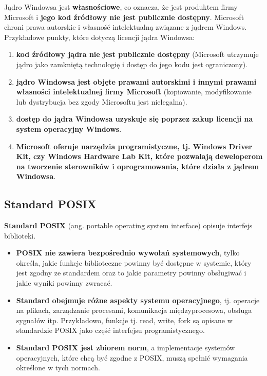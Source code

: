 \documentclass{article}
\begin{document}
Jądro Windowsa jest \textbf{własnościowe}, co oznacza, że jest produktem firmy Microsoft i \textbf{jego kod źródłowy nie jest publicznie dostępny}. Microsoft chroni prawa autorskie i własność intelektualną związane z jądrem Windows.
Przykładowe punkty, które dotyczą licencji jądra Windowsa: 
\begin{enumerate}
    \item \textbf{kod źródłowy jądra nie jest publicznie dostępny} (Microsoft utrzymuje jądro jako zamkniętą technologię i dostęp do jego kodu jest ograniczony).
    \item \textbf{jądro Windowsa jest objęte prawami autorskimi i innymi prawami własności intelektualnej firmy Microsoft} (kopiowanie, modyfikowanie lub dystrybucja bez zgody Microsoftu jest nielegalna). 
    \item \textbf{dostęp do jądra Windowsa uzyskuje się poprzez zakup licencji na system operacyjny Windows}.
    \item \textbf{Microsoft oferuje narzędzia programistyczne, tj. Windows Driver Kit, czy Windows Hardware Lab Kit, które pozwalają deweloperom na tworzenie sterowników i oprogramowania, które działa z jądrem Windowsa}.
\end{enumerate}

\subsection{Standard POSIX}
\textbf{Standard POSIX} (ang. portable operating system interface) opisuje interfejs biblioteki. 
\begin{itemize}
    \item \textbf{POSIX nie zawiera bezpośrednio wywołań systemowych}, tylko określa, jakie funkcje biblioteczne powinny być dostępne w systemie, który jest zgodny ze standardem oraz to jakie parametry powinny obsługiwać i jakie wyniki powinny zwracać.
    \item \textbf{Standard obejmuje różne aspekty systemu operacyjnego}, tj. operacje na plikach, zarządzanie procesami, komunikacja międzyprocesowa, obsługa sygnałów itp. Przykładowo, funkcje tj. read, write, fork są opisane w standardzie POSIX jako część interfejsu programistycznego.
    \item \textbf{Standard POSIX jest zbiorem norm}, a implementacje systemów operacyjnych, które chcą być zgodne z POSIX, muszą spełnić wymagania określone w tych normach.
\end{itemize}
\end{document}
